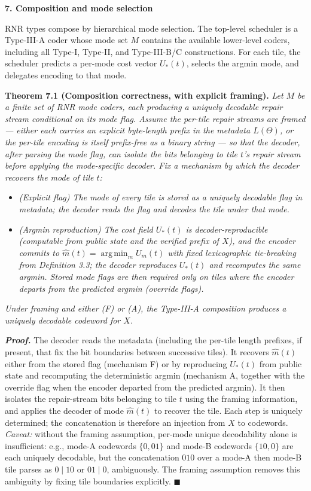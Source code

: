 \documentclass[
]{article}
\begin{document}
\textbf{7. Composition and mode selection}

RNR types compose by hierarchical mode selection. The top-level
scheduler is a Type-III-A coder whose mode set $M$ contains the
available lower-level coders, including all Type-I, Type-II, and
Type-III-B/C constructions. For each tile, the scheduler predicts a
per-mode cost vector $U_*(t)$, selects the argmin mode, and delegates
encoding to that mode.

\textbf{Theorem 7.1 (Composition correctness, with explicit framing).}
\emph{Let $M$ be a finite set of RNR mode coders, each producing a
uniquely decodable repair stream conditional on its mode flag.
Assume the per-tile repair streams are \emph{framed} --- either each
carries an explicit byte-length prefix in the metadata $L(\Theta)$,
or the per-tile encoding is itself prefix-free as a binary string
--- so that the decoder, after parsing the mode flag, can isolate
the bits belonging to tile $t$'s repair stream before applying the
mode-specific decoder. Fix a mechanism by which the decoder
recovers the mode of tile $t$:}
\begin{itemize}
\item[\textbf{(F)}] \emph{(\emph{Explicit flag}) The mode of every tile
is stored as a uniquely decodable flag in metadata; the decoder
reads the flag and decodes the tile under that mode.}
\item[\textbf{(A)}] \emph{(\emph{Argmin reproduction}) The cost field
$U_*(t)$ is decoder-reproducible (computable from public state and
the verified prefix of $X$), and the encoder commits to
$\hat{m}(t) = \operatorname*{arg\,min}_m U_m(t)$ with fixed
lexicographic tie-breaking from Definition 3.3; the decoder
reproduces $U_*(t)$ and recomputes the same argmin. Stored mode
flags are then required only on tiles where the encoder departs
from the predicted argmin (override flags).}
\end{itemize}
\emph{Under framing and either (F) or (A), the Type-III-A composition
produces a uniquely decodable codeword for $X$.}

\emph{\textbf{Proof.}} The decoder reads the metadata (including the
per-tile length prefixes, if present, that fix the bit boundaries
between successive tiles). It recovers $\hat{m}(t)$ either from the
stored flag (mechanism F) or by reproducing $U_*(t)$ from public
state and recomputing the deterministic argmin (mechanism A,
together with the override flag when the encoder departed from the
predicted argmin). It then isolates the repair-stream bits
belonging to tile $t$ using the framing information, and applies
the decoder of mode $\hat{m}(t)$ to recover the tile. Each step is uniquely determined; the concatenation is
therefore an injection from $X$ to codewords. \emph{Caveat:} without
the framing assumption, per-mode unique decodability alone is
insufficient: e.g., mode-A codewords $\{0, 01\}$ and mode-B
codewords $\{10, 0\}$ are each uniquely decodable, but the
concatenation $010$ over a mode-A then mode-B tile parses as
$0 \mid 10$ or $01 \mid 0$, ambiguously. The framing assumption
removes this ambiguity by fixing tile boundaries explicitly.
\hfill$\blacksquare$
\end{document}

